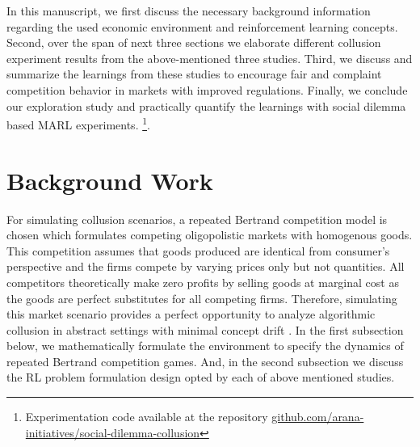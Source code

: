 \documentclass{article}
\begin{document}
In this manuscript, we first discuss the necessary background information regarding the used economic environment and reinforcement learning concepts.
Second, over the span of next three sections we elaborate different collusion experiment results from the above-mentioned three studies.
Third, we discuss and summarize the learnings from these studies to encourage fair and complaint competition behavior in markets with improved regulations.
Finally, we conclude our exploration study and practically quantify the learnings with social dilemma based MARL experiments. \footnote{Experimentation code available at the repository \href{https://github.com/arana-initiatives/social-dilemma-collusion}{github.com/arana-initiatives/social-dilemma-collusion}}.


\section{Background Work}


For simulating collusion scenarios, a repeated Bertrand competition model is chosen which formulates competing oligopolistic markets with homogenous goods.
This competition assumes that goods produced are identical from consumer’s perspective and the firms compete by varying prices only but not quantities.
All competitors theoretically make zero profits by selling goods at marginal cost as the goods are perfect substitutes for all competing firms.
Therefore, simulating this market scenario provides a perfect opportunity to analyze algorithmic collusion in abstract settings with minimal concept drift \cite{lu2018learning}.
In the first subsection below, we mathematically formulate the environment to specify the dynamics of repeated Bertrand competition games.
And, in the second subsection we discuss the RL problem formulation design opted by each of above mentioned studies.



\end{document}
